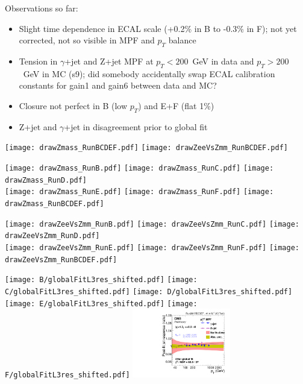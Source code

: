 \documentclass[landscape,10pt]{beamer} %
\begin{document}
Observations so far:
\begin{itemize}
\item Slight time dependence in ECAL scale (+0.2\% in B to -0.3\% in F); not yet corrected, not so visible in MPF and $p_T$ balance
\item Tension in $\gamma$+jet and Z+jet MPF at $p_T<200$~GeV in data and $p_T>200$~GeV in MC (s9); did somebody accidentally swap ECAL calibration constants for gain1 and gain6 between data and MC?
\item Closure not perfect in B (low $p_T$) and E+F (flat 1\%)
\item Z+jet and $\gamma$+jet in disagreement prior to global fit
\end{itemize}


\newpage

\texttt{[image: drawZmass\_RunBCDEF.pdf]}
\texttt{[image: drawZeeVsZmm\_RunBCDEF.pdf]}

\newpage

\texttt{[image: drawZmass\_RunB.pdf]}
\texttt{[image: drawZmass\_RunC.pdf]}
\texttt{[image: drawZmass\_RunD.pdf]}\\
\texttt{[image: drawZmass\_RunE.pdf]}
\texttt{[image: drawZmass\_RunF.pdf]}
\texttt{[image: drawZmass\_RunBCDEF.pdf]}\\

\newpage

\texttt{[image: drawZeeVsZmm\_RunB.pdf]}
\texttt{[image: drawZeeVsZmm\_RunC.pdf]}
\texttt{[image: drawZeeVsZmm\_RunD.pdf]}\\
\texttt{[image: drawZeeVsZmm\_RunE.pdf]}
\texttt{[image: drawZeeVsZmm\_RunF.pdf]}
\texttt{[image: drawZeeVsZmm\_RunBCDEF.pdf]}\\

\newpage



\texttt{[image: B/globalFitL3res\_shifted.pdf]}
\texttt{[image: C/globalFitL3res\_shifted.pdf]}
\texttt{[image: D/globalFitL3res\_shifted.pdf]}\\
\texttt{[image: E/globalFitL3res\_shifted.pdf]}
\texttt{[image: F/globalFitL3res\_shifted.pdf]}
\includegraphics[width=0.32\textwidth]{BCDEF/globalFitL3res_shifted.pdf}\\
\end{document}
